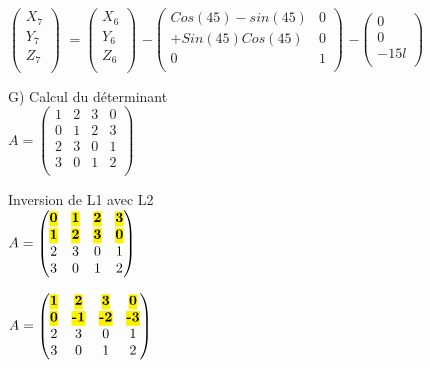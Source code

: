 $
\begin{pmatrix}
  X_{7} \\
  Y_{7} \\
  Z_{7} \\
\end{pmatrix}
$
\vspace{5mm} %
$
=
\begin{pmatrix}
  X_{6} \\
  Y_{6} \\
  Z_{6} \\
\end{pmatrix}
$
\vspace{5mm} %
$
 -
\begin{pmatrix}
  Cos(45)-sin(45) & 0  \\
  +Sin(45)Cos(45) & 0 \\
  0 & 1 \\
\end{pmatrix}
$
$
 -
\begin{pmatrix}
  0  \\
  0 \\
  -15l \\
\end{pmatrix}
$

\newpage

G) Calcul du déterminant \\

$
A =
\begin{pmatrix}
  1 & 2 & 3 & 0 \\
  0 & 1 & 2 & 3 \\
  2 & 3 & 0 & 1 \\
  3 & 0 & 1 & 2 \\
\end{pmatrix}
$

\vspace{10mm} %
Inversion de L1 avec L2\\

$
A =
\begin{pmatrix}
  \hl{\textbf{0}} & \hl{\textbf{1}} & \hl{\textbf{2}} & \hl{\textbf{3}} \\
  \hl{\textbf{1}} & \hl{\textbf{2}} & \hl{\textbf{3}} & \hl{\textbf{0}} \\
  2 & 3 & 0 & 1 \\
  3 & 0 & 1 & 2 \\
\end{pmatrix}
$
\vspace{5mm} %

$
A =
\begin{pmatrix}
  \hl{\textbf{1}} & \hl{\textbf{2}} & \hl{\textbf{3}} & \hl{\textbf{0}} \\
  \hl{\textbf{0}} & \hl{\textbf{-1}} & \hl{\textbf{-2}} & \hl{\textbf{-3}} \\
  2 & 3 & 0 & 1 \\
  3 & 0 & 1 & 2 \\
\end{pmatrix}
$

